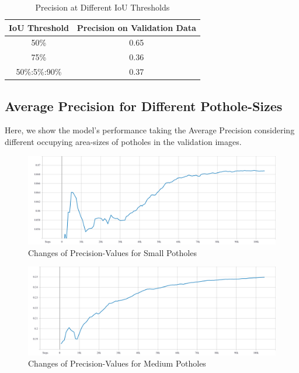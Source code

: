             \begin{table}
                \centering
                \begin{tabular}{|c||c|} \hline 
                     IoU Threshold  &  Precision on Validation Data \\\hline\hline
                     50\%  &  0.65 \\\hline
                     75\%  &  0.36 \\\hline
                     50\%:5\%:90\%  &  0.37 \\\hline
                \end{tabular}
                \caption{Precision at Different IoU Thresholds}
                \label{tab:precision_iou}
            \end{table}
            
        \clearpage
        \subsection{Average Precision for Different Pothole-Sizes}
            Here, we show the model's performance taking the Average Precision considering different occupying area-sizes of potholes in the validation images.
            
            \begin{figure}[h]
                \centering
                \includegraphics[width=\textwidth]{images/mAP-small.pdf}
                \caption{Changes of Precision-Values for Small Potholes}
                \label{fig:precision_sizes_small}
            \end{figure}
            
            \begin{figure}[h]
                \centering
                \includegraphics[width=\textwidth]{images/mAP-medium.pdf}
                \caption{Changes of Precision-Values for Medium Potholes}
                \label{fig:precision_sizes_medium}
            \end{figure}
            

